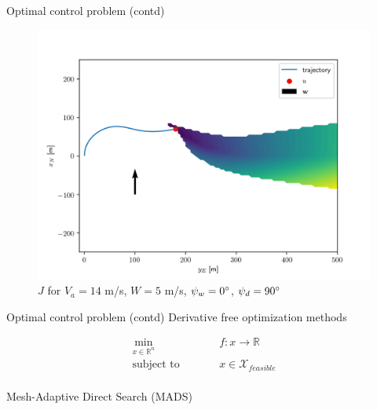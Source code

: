 \documentclass{beamer}
\begin{document}
\begin{frame}{Optimal control problem (contd)}
    \begin{figure}
        \begin{center}
            \includegraphics[width=.8\linewidth]{fig/J_opt_90.png}
        \end{center}
        \caption{$J$ for $V_a=14$ m/s, $W=5$ m/s, $\psi_w=0\degree$, $\psi_d=90\degree$}
    \end{figure}
\end{frame}

\begin{frame}{Optimal control problem (contd)}
    Derivative free optimization methods

    \begin{subequations}
        \label{eq:derivative_free_opt}
        \begin{alignat}{3}
        &\min_{x\in\mathbb{R}^n}        &\qquad& f: x \rightarrow \mathbb{R} & \\
        &\text{subject to} & & x\in\mathcal{X}_{feasible} &\\
        \end{alignat}
    \end{subequations}

    Mesh-Adaptive Direct Search (MADS)
\end{frame}
\end{document}
